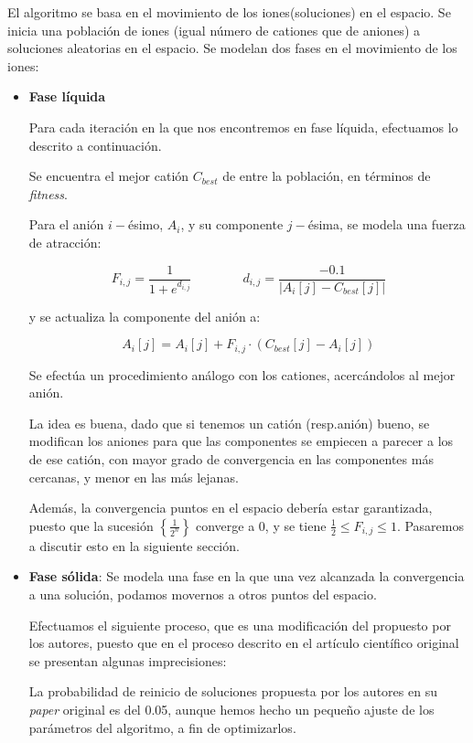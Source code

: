 \documentclass[a4paper,11pt]{article}
\begin{document}
El algoritmo se basa en el movimiento de los iones(soluciones) en el espacio. Se inicia una población de iones (igual número
de cationes que de aniones) a soluciones aleatorias en el espacio.
Se modelan dos fases en el movimiento de los iones:
\begin{itemize}
 \item \textbf{Fase líquida}
 
 Para cada iteración en la que nos encontremos en fase líquida, efectuamos lo descrito a continuación.
 
 Se encuentra el mejor catión $C_{best}$ de entre la población, en términos de \textit{fitness}.
 
 Para el anión $i-$ésimo, $A_i$, y su componente $j-$ésima, se modela una fuerza de atracción:
 
 $$F_{i,j} = \frac{1}{1+e^{d_{i,j}}} \qquad \qquad d_{i,j} = {\frac{-0.1}{|A_{i}[j] - C_{best}[j]|}}$$ 
 
 y se actualiza la componente del anión a:
 
 $$A_i[j] = A_i[j] + F_{i,j} \cdot (C_{best}[j] - A_i[j])$$
 
 Se efectúa un procedimiento análogo con los cationes, acercándolos al mejor anión.
 
 La idea es buena, dado que si tenemos un catión (resp.anión) bueno, se modifican los aniones para que las componentes se
 empiecen a parecer a los de ese catión, con mayor grado de convergencia en las componentes más cercanas, y menor en las más
 lejanas.
 
 Además, la convergencia puntos en el espacio debería estar garantizada, puesto que la sucesión $\left\{\frac{1}{2^n}\right\}$ converge
 a 0, y se tiene $ \frac{1}{2} \le F_{i,j} \le 1$. Pasaremos a discutir esto en la siguiente sección.
 
 
 \item \textbf{Fase sólida}: Se modela una fase en la que una vez alcanzada la convergencia a una solución, podamos movernos
 a otros puntos del espacio.
 
 Efectuamos el siguiente proceso, que es una modificación del propuesto por los autores, puesto que en el proceso descrito
 en el artículo científico original se presentan algunas imprecisiones:
 
  \small{\texttt{}}
  \normalsize

 La probabilidad de reinicio de soluciones propuesta por los autores en su \textit{paper} original es del 0.05, aunque hemos
 hecho un pequeño ajuste de los parámetros del algoritmo, a fin de optimizarlos.
 

\end{itemize}
\end{document}
